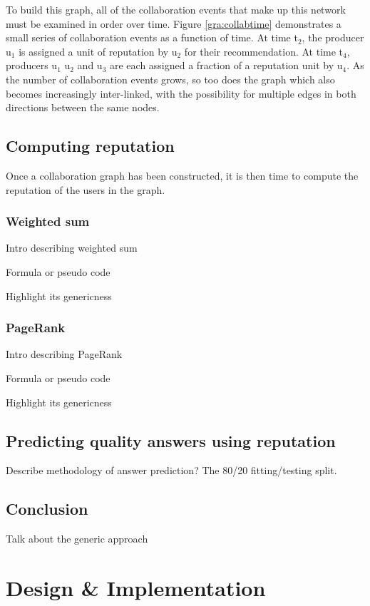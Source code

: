 \documentclass[]{final_report}
\begin{document}
To build this graph, all of the collaboration events that make up this network must be examined in order over time. Figure \ref{gra:collabtime} demonstrates a small series of collaboration events as a function of time. At time t$_{2}$, the producer u$_{1}$ is assigned a unit of reputation by u$_{2}$ for their recommendation. At time t$_{4}$, producers u$_{1}$ u$_{2}$ and u$_{3}$ are each assigned a fraction of a reputation unit by u$_{4}$. As the number of collaboration events grows, so too does the graph which also becomes increasingly inter-linked, with the possibility for multiple edges in both directions between the same nodes.

\section{Computing reputation}

Once a collaboration graph has been constructed, it is then time to compute the reputation of the users in the graph. 

\subsection{Weighted sum}

Intro describing weighted sum

Formula or pseudo code

Highlight its genericness

\subsection{PageRank}

Intro describing PageRank

Formula or pseudo code

Highlight its genericness

\section{Predicting quality answers using reputation}

Describe methodology of answer prediction? The 80/20 fitting/testing split.

\section{Conclusion}

Talk about the generic approach

\chapter{Design \& Implementation}
\end{document}
